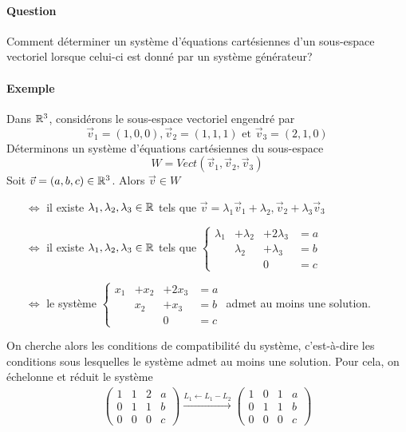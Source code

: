 \paragraph{Question} Comment déterminer un système d'équations cartésiennes d'un sous-espace vectoriel lorsque celui-ci est donné par un système générateur?

\paragraph{Exemple} Dans $\mathbb{R}^3$, considérons le sous-espace vectoriel engendré par 
$$\vec{v}_1 = (1, 0, 0), \vec{v}_2 = (1, 1, 1) \text{ et }\vec{v}_3 = (2, 1, 0)$$
Déterminons un système d'équations cartésiennes du sous-espace 
$$W = Vect(\vec{v}_1, \vec{v}_2, \vec{v}_3)$$
Soit $\vec{v} = (a, b, c) \in \mathbb{R}^3$. Alors $\vec{v} \in W$ 
\begin{itemize}
  \item[$\Leftrightarrow$] il existe $\lambda_1, \lambda_2, \lambda_3 \in \mathbb{R}$ tels que $\vec{v} = \lambda_1 \vec{v}_1 + \lambda_2, \vec{v}_2 + \lambda_3 \vec{v}_3$ 
  \item[$\Leftrightarrow$] il existe $\lambda_1, \lambda_2, \lambda_3 \in \mathbb{R}$ tels que 
    $\left\{ \begin{array}{rrrc}
       \lambda_1 & + \lambda_2 & + 2 \lambda_3 & = a \\
       & \lambda_2 & + \lambda_3 & = b \\
       &  & 0 & = c
    \end{array} \right. $
  \item [$\Leftrightarrow$] le système 
    $\left\{ \begin{array}{rrrc}
      x_1 & + x_2 & + 2 x_3 & = a \\
       & x_2 & + x_3 & = b \\
       &  & 0 & = c
    \end{array} \right. $ admet au moins une solution.
\end{itemize}
On cherche alors les conditions de compatibilité du système, c'est-à-dire les conditions sous lesquelles le système admet au moins une solution. Pour cela, on échelonne et réduit le système
\begin{eqnarray*}
  \begin{pmatrix}
    1 & 1 & 2 & a \\
    0 & 1 & 1 & b \\
    0 & 0 & 0 & c
  \end{pmatrix}
  \xrightarrow{L_1 \leftarrow L_1 - L_2} 
  \begin{pmatrix}
    1 & 0 & 1 & a \\
    0 & 1 & 1 & b \\
    0 & 0 & 0 & c
  \end{pmatrix}
\end{eqnarray*}
